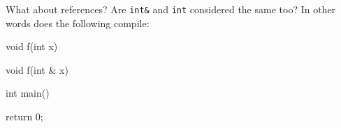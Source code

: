 What about references? Are \texttt{int\&} and \texttt{int} considered the same too? In other words does the following compile:



\begin{consolethree}[escapeinside=||]

void f(int x)

{

}



void f(int & x)

{

}



int main()

{

    return 0;

}

\end{consolethree}

